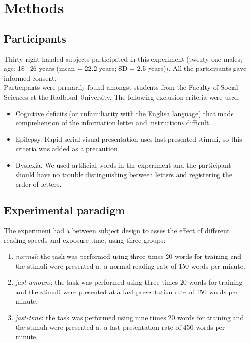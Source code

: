 \section{Methods}
\label{sec:method}

\subsection{Participants}
Thirty right-handed subjects participated in this experiment (twenty-one males; age: 18$-$26 years (mean = 22.2 years; SD = 2.5 years)). All the participants gave informed consent.\\
Participants were primarily found amongst students from the Faculty of Social Sciences at the Radboud University. The following exclusion criteria were used:
\begin{itemize}
	\item Cognitive deficits (or unfamiliarity with the English language) that made comprehension of the information letter and instructions difficult.
	\item Epilepsy. Rapid serial visual presentation uses fast presented stimuli, so this criteria was added as a precaution.
	\item Dyslexia. We used artificial words in the experiment and the participant should have no trouble distinguishing between letters and registering the order of letters.
\end{itemize}

\subsection{Experimental paradigm}
The experiment had a between subject design to asses the effect of different reading speeds and exposure time, using three groups:
\begin{enumerate}
	\item \textit{normal}: the task was performed using three times 20 words for training and the stimuli were presented at a normal reading rate of 150 words per minute.
	\item \textit{fast-amount}: the task was performed using three times 20 words for training and the stimuli were presented at a fast presentation rate of 450 words per minute.
	\item \textit{fast-time}: the task was performed using nine times 20 words for training and the stimuli were presented at a fast presentation rate of 450 words per minute.
\end{enumerate}


